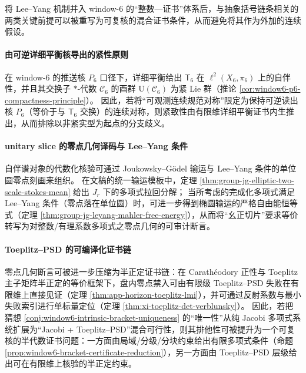 \begin{remark}\label{rem:window6-leyang-toeplitz-mixed-certificates}
将 Lee--Yang 机制并入 window-\(6\) 的“整数—证书”体系后，与抽象括号链条相关的两类关键前提可以被重写为可复核的混合证书条件，从而避免将其作为外加的连续假设。

\paragraph{由可逆详细平衡核导出的紧性原则}
在 window-\(6\) 的推送核 \(P_6\) 口径下，详细平衡给出 \(\mathsf{T}_6\) 在 \(\ell^2(X_6,\pi_6)\) 上的自伴性，并且其交换子 \(*\)-代数 \(\mathcal C_6\) 的酉群 \(\mathrm U(\mathcal C_6)\) 为紧 Lie 群（推论 \ref{cor:window6-p6-compactness-principle}）。
因此，若将“可观测连续规范对称”限定为保持可逆读出核 \(P_6\)（等价于与 \(\mathsf{T}_6\) 交换）的连续对称，则紧致性由有限维详细平衡证书内生推出，从而排除以非紧实型为起点的分支歧义。

\paragraph{unitary slice 的零点几何译码与 Lee--Yang 条件}
自伴谱对象的代数化核验可通过 Joukowsky--Gödel 输运与 Lee--Yang 条件的单位圆零点刻画来组织。
在文稿的统一输运模板中，定理 \ref{thm:group-jg-elliptic-two-scale-stokes-mean} 给出 \(J_r\) 下的多项式拉回分解；
当所考虑的完成化多项式满足 Lee--Yang 条件（零点落在单位圆）时，可进一步得到椭圆输运的严格自由能恒等式（定理 \ref{thm:group-jg-leyang-mahler-free-energy}），从而将“幺正切片”要求等价转写为对整数/有理系数多项式之零点几何的可审计断言。

\paragraph{Toeplitz--PSD 的可编译化证书链}
零点几何断言可被进一步压缩为半正定证书链：在 Carath\'eodory 正性与 Toeplitz 主子矩阵半正定的等价框架下，盘内零点禁入可由有限级 Toeplitz--PSD 失败在有限维上直接见证（定理 \ref{thm:app-horizon-toeplitz-lmi}），并可通过反射系数与最小失败索引进行单标量定位（定理 \ref{thm:xi-toeplitz-det-verblunsky}）。
因此，若把猜想 \ref{conj:window6-intrinsic-bracket-uniqueness} 的“唯一性”从纯 Jacobi 多项式系统扩展为“Jacobi + Toeplitz--PSD”混合可行性，则其排他性可被提升为一个可复核的半代数证书问题：一方面由局域/分级/分块约束给出有限多项式条件（命题 \ref{prop:window6-bracket-certificate-reduction}），另一方面由 Toeplitz--PSD 层级给出可在有限维上核验的半正定约束。


\end{remark}
